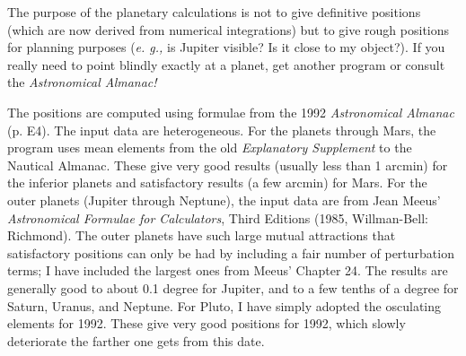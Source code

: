 
The purpose of the planetary calculations is not to give definitive
positions (which are now derived from numerical integrations) but
to give rough positions for planning purposes ({\it e. g.,} is Jupiter 
visible?  Is it close to my object?).  If you really need to point 
blindly exactly at a planet, get another program or consult the 
{\it Astronomical Almanac!}

The positions are computed using formulae from the 1992 {\it Astronomical
Almanac} (p. E4).  The input data are heterogeneous.  For the planets 
through Mars, the program uses mean elements from the old 
{\it Explanatory Supplement\/} to the Nautical Almanac.  These give very 
good results (usually less than 1 arcmin) for the inferior planets and 
satisfactory results (a few arcmin) for Mars.  For the outer planets 
(Jupiter through Neptune), the input data are from Jean Meeus' 
{\it Astronomical Formulae for Calculators}, Third Editions (1985, 
Willman-Bell: Richmond).  The outer planets have such large mutual 
attractions that satisfactory positions can only be had by including a 
fair number of perturbation terms; I have included the largest ones from 
Meeus' Chapter 24.   The results are generally good to about 0.1 degree 
for Jupiter, and to a few tenths of a degree for Saturn, Uranus, and Neptune.
For Pluto, I have simply adopted the osculating elements for 1992.  These 
give very good positions for 1992, which slowly deteriorate the farther one 
gets from this date.


